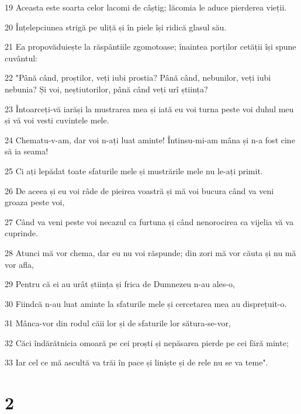 \par 19 Aceasta este soarta celor lacomi de câștig; lăcomia le aduce pierderea vieții.
\par 20 Înțelepciunea strigă pe uliță și în piele își ridică glasul său.
\par 21 Ea propovăduiește la răspântiile zgomotoase; înaintea porților cetății își spune cuvântul:
\par 22 "Până când, proștilor, veți iubi prostia? Până când, nebunilor, veți iubi nebunia? Și voi, neștiutorilor, până când veți urî știința?
\par 23 Întoarceți-vă iarăși la mustrarea mea și iată eu voi turna peste voi duhul meu și vă voi vesti cuvintele mele.
\par 24 Chematu-v-am, dar voi n-ați luat aminte! Întinsu-mi-am mâna și n-a fost cine să ia seama!
\par 25 Ci ați lepădat toate sfaturile mele și mustrările mele nu le-ați primit.
\par 26 De aceea și eu voi râde de pieirea voastră și mă voi bucura când va veni groaza peste voi,
\par 27 Când va veni peste voi necazul ca furtuna și când nenorocirea ca vijelia vă va cuprinde.
\par 28 Atunci mă vor chema, dar eu nu voi răspunde; din zori mă vor căuta și nu mă vor afla,
\par 29 Pentru că ei au urât știința și frica de Dumnezeu n-au ales-o,
\par 30 Fiindcă n-au luat aminte la sfaturile mele și cercetarea mea au disprețuit-o.
\par 31 Mânca-vor din rodul căii lor și de sfaturile lor sătura-se-vor,
\par 32 Căci îndărătnicia omoară pe cei proști și nepăsarea pierde pe cei fără minte;
\par 33 Iar cel ce mă ascultă va trăi în pace și liniște și de rele nu se va teme".

\chapter{2}

